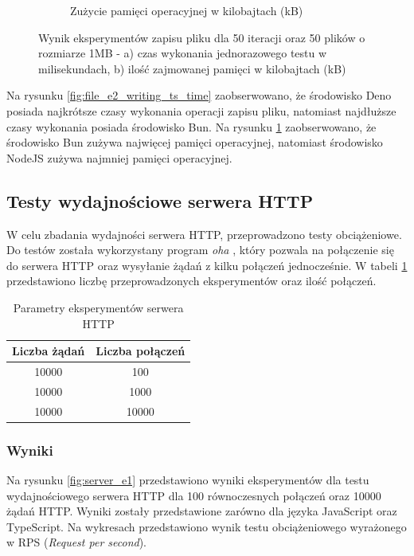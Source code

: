 \begin{figure}[H]
\begin{subfigure}[b]{0.42\textwidth}
    \caption{Zużycie pamięci operacyjnej w kilobajtach (kB)}
    \label{fig:file_e2_writing_ts_memory}
  \end{subfigure}
  \caption{Wynik eksperymentów zapisu pliku dla 50 iteracji oraz 50 plików o rozmiarze 1MB - a) czas wykonania jednorazowego testu w milisekundach, b) ilość zajmowanej pamięci w kilobajtach (kB)}
  \label{fig:file_e2_writing_ts}
\end{figure}

Na rysunku \ref{fig:file_e2_writing_ts_time} zaobserwowano, że środowisko Deno posiada najkrótsze czasy wykonania operacji zapisu pliku, natomiast najdłuższe czasy wykonania posiada środowisko Bun. Na rysunku \ref{fig:file_e2_writing_ts_memory} zaobserwowano, że środowisko Bun zużywa najwięcej pamięci operacyjnej, natomiast środowisko NodeJS zużywa najmniej pamięci operacyjnej.

\subsection{Testy wydajnościowe serwera HTTP}
W celu zbadania wydajności serwera HTTP, przeprowadzono testy obciążeniowe. Do testów została wykorzystany program \textit{oha} \cite{oha}, który pozwala na połączenie się do serwera HTTP oraz wysyłanie żądań z kilku połączeń jednocześnie. W tabeli \ref{tab:http_experiments} przedstawiono liczbę przeprowadzonych eksperymentów oraz ilość połączeń.

\begin{table}[H]
  \centering
  \caption{Parametry eksperymentów serwera HTTP}
  \begin{tabular}{|c|c|}
    \hline
    \textbf{Liczba żądań} & \textbf{Liczba połączeń}\\ \hline
    10000 & 100 \\ \hline
    10000 & 1000 \\ \hline
    10000 & 10000 \\ \hline
  \end{tabular}
  \label{tab:http_experiments}
\end{table}

\subsubsection{Wyniki}
Na rysunku \ref{fig:server_e1} przedstawiono wyniki eksperymentów dla testu wydajnościowego serwera HTTP dla 100 równoczesnych połączeń oraz 10000 żądań HTTP. Wyniki zostały przedstawione zarówno dla języka JavaScript oraz TypeScript. Na wykresach przedstawiono wynik testu obciążeniowego wyrażonego w RPS (\textit{Request per second}).

